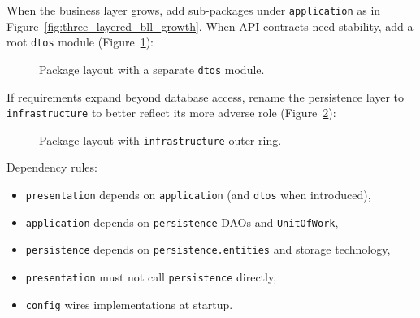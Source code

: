 When the business layer grows, add sub-packages under \texttt{application} as in Figure~\ref{fig:three_layered_bll_growth}. When API contracts need stability, add a root \texttt{dtos} module (Figure~\ref{fig:three_layered_package_dtos}):

\begin{figure}[htbp]
\centering
\begin{minipage}{0.8\textwidth}
\end{minipage}
\caption{Package layout with a separate \texttt{dtos} module.}
\label{fig:three_layered_package_dtos}
\end{figure}

If requirements expand beyond database access, rename the persistence layer to \texttt{infrastructure} to better reflect its more adverse role (Figure~\ref{fig:three_layered_package_infrastructure}):

\begin{figure}[htbp]
\centering
\begin{minipage}{0.8\textwidth}
\end{minipage}
\caption{Package layout with \texttt{infrastructure} outer ring.}
\label{fig:three_layered_package_infrastructure}
\end{figure}

Dependency rules:
\begin{itemize}
    \item \texttt{presentation} depends on \texttt{application} (and \texttt{dtos} when introduced),
    \item \texttt{application} depends on \texttt{persistence} DAOs and \texttt{UnitOfWork},
    \item \texttt{persistence} depends on \texttt{persistence.entities} and storage technology,
    \item \texttt{presentation} must not call \texttt{persistence} directly,
    \item \texttt{config} wires implementations at startup.
\end{itemize}


